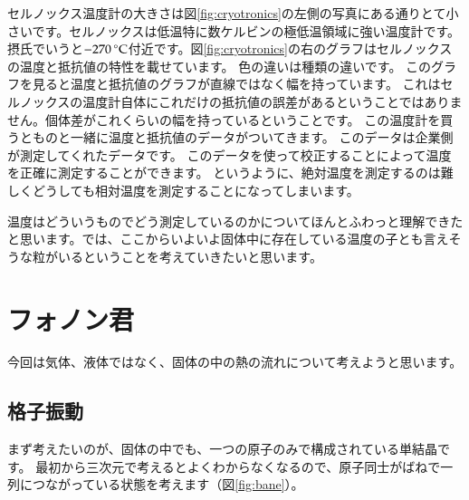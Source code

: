 \documentclass[10pt,b5paper,papersize,dvipdfmx]{jsbook}
\begin{document}
セルノックス温度計の大きさは図\ref{fig:cryotronics}の左側の写真にある通りとて小さいです。セルノックスは低温特に数ケルビンの極低温領域に強い温度計です。
摂氏でいうと$-270\tani{\degreeCelsius}$付近です。図\ref{fig:cryotronics}の右のグラフはセルノックスの温度と抵抗値の特性を載せています。
色の違いは種類の違いです。
このグラフを見ると温度と抵抗値のグラフが直線ではなく幅を持っています。
これはセルノックスの温度計自体にこれだけの抵抗値の誤差があるということではありません。個体差がこれくらいの幅を持っているということです。
この温度計を買うとものと一緒に温度と抵抗値のデータがついてきます。
このデータは企業側が測定してくれたデータです。
このデータを使って校正することによって温度を正確に測定することができます。
というように、絶対温度を測定するのは難しくどうしても相対温度を測定することになってしまいます。\par
温度はどういうものでどう測定しているのかについてほんとふわっと理解できたと思います。では、ここからいよいよ固体中に存在している温度の子とも言えそうな粒がいるということを考えていきたいと思います。


\section{フォノン君}
今回は気体、液体ではなく、固体の中の熱の流れについて考えようと思います。

\subsection{格子振動}
まず考えたいのが、固体の中でも、一つの原子のみで構成されている単結晶です。
最初から三次元で考えるとよくわからなくなるので、原子同士がばねで一列につながっている状態を考えます（図\ref{fig:bane}）。\par
\end{document}
